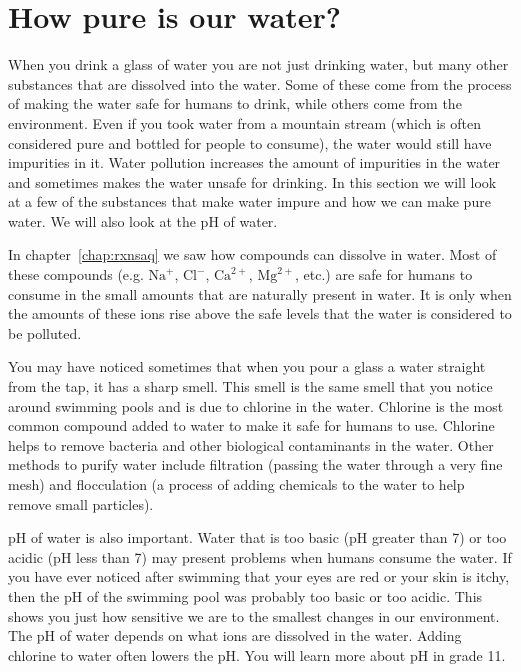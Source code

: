 \section{How pure is our water?}
            \nopagebreak
\label{m38138*id0832745}
When you drink a glass of water you are not just drinking water, but many other substances that are dissolved into the water. Some of these come from the process of making the water safe for humans to drink, while others come from the environment. Even if you took water from a mountain stream (which is often considered pure and bottled for people to consume), the water would still have impurities in it. Water pollution increases the amount of impurities in the water and sometimes makes the water unsafe for drinking. In this section we will look at a few of the substances that make water impure and how we can make pure water. We will also look at the pH of water.
\par 
\label{m38138*id08324}
In chapter~\ref{chap:rxnsaq} we saw how compounds can dissolve in water. Most of these compounds (e.g. ${\text{Na}}^{+}$, ${\text{Cl}}^{-}$, ${\text{Ca}}^{2+}$, ${\text{Mg}}^{2+}$, etc.) are safe for humans to consume in the small amounts that are naturally present in water. It is only when the amounts of these ions rise above the safe levels that the water is considered to be polluted.
\par 
\label{m38138*id08322346}You may have noticed sometimes that when you pour a glass a water straight from the tap, it has a sharp smell. This smell is the same smell that you notice around swimming pools and is due to chlorine in the water. Chlorine is the most common compound added to water to make it safe for humans to use. Chlorine helps to remove bacteria and other biological contaminants in the water. Other methods to purify water include filtration (passing the water through a very fine mesh) and flocculation (a process of adding chemicals to the water to help remove small particles). 
\par 
\label{m38138*id0832}
pH of water is also important. Water that is too basic (pH greater than 7) or too acidic (pH less than 7) may present problems when humans consume the water. If you have ever noticed after swimming that your eyes are red or your skin is itchy, then the pH of the swimming pool was probably too basic or too acidic. This shows you just how sensitive we are to the smallest changes in our environment. The pH of water depends on what ions are dissolved in the water. Adding chlorine to water often lowers the pH. You will learn more about pH in grade 11. 
